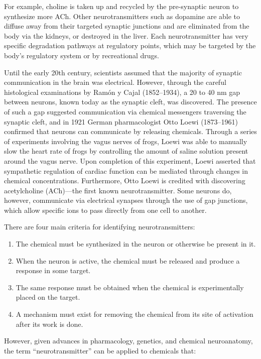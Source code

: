 For example, choline is taken up and recycled by the pre-synaptic neuron to synthesize more ACh. Other neurotransmitters such as dopamine are able to diffuse away from their targeted synaptic junctions and are eliminated from the body via the kidneys, or destroyed in the liver. Each neurotransmitter has very specific degradation pathways at regulatory points, which may be targeted by the body's regulatory system or by recreational drugs.

Until the early 20th century, scientists assumed that the majority of synaptic communication in the brain was electrical. However, through the careful histological examinations by Ramón y Cajal (1852--1934), a 20 to 40 nm gap between neurons, known today as the synaptic cleft, was discovered. The presence of such a gap suggested communication via chemical messengers traversing the synaptic cleft, and in 1921 German pharmacologist Otto Loewi (1873--1961) confirmed that neurons can communicate by releasing chemicals. Through a series of experiments involving the vagus nerves of frogs, Loewi was able to manually slow the heart rate of frogs by controlling the amount of saline solution present around the vagus nerve. Upon completion of this experiment, Loewi asserted that sympathetic regulation of cardiac function can be mediated through changes in chemical concentrations. Furthermore, Otto Loewi is credited with discovering acetylcholine (ACh)---the first known neurotransmitter. Some neurons do, however, communicate via electrical synapses through the use of gap junctions, which allow specific ions to pass directly from one cell to another.

There are four main criteria for identifying neurotransmitters:

\begin{enumerate}
\def\labelenumi{\arabic{enumi}.}
\tightlist
\item
  The chemical must be synthesized in the neuron or otherwise be present in it.
\item
  When the neuron is active, the chemical must be released and produce a response in some target.
\item
  The same response must be obtained when the chemical is experimentally placed on the target.
\item
  A mechanism must exist for removing the chemical from its site of activation after its work is done.
\end{enumerate}

However, given advances in pharmacology, genetics, and chemical neuroanatomy, the term ``neurotransmitter'' can be applied to chemicals that:

